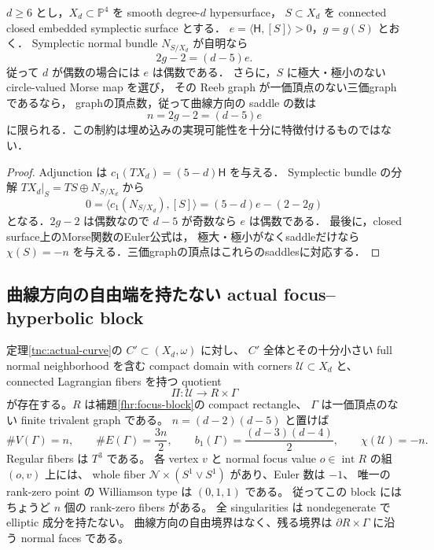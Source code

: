 \begin{corollary}
\label{tnc:degree-genus-parity}
$d\ge6$ とし，$X_d\subset\mathbb P^4$ を smooth degree-$d$ hypersurface，
$S\subset X_d$ を connected closed embedded symplectic surface とする．
$e=\langle\mathsf H,[S]\rangle>0$，$g=g(S)$ とおく．
Symplectic normal bundle $N_{S/X_d}$ が自明なら
\[
 2g-2=(d-5)e.
\]
従って $d$ が偶数の場合には $e$ は偶数である．
さらに，$S$ に極大・極小のない circle-valued Morse map を選び，
その Reeb graph が一価頂点のない三価graphであるなら，
graphの頂点数，従って曲線方向の saddle の数は
\[
 n=2g-2=(d-5)e
\]
に限られる．この制約は埋め込みの実現可能性を十分に特徴付けるものではない．
\end{corollary}

\begin{proof}
Adjunction は
$c_1(TX_d)=(5-d)\mathsf H$ を与える．
Symplectic bundle の分解 $TX_d|_S=TS\oplus N_{S/X_d}$ から
\[
 0=\langle c_1(N_{S/X_d}),[S]\rangle
  =(5-d)e-(2-2g)
\]
となる．$2g-2$ は偶数なので $d-5$ が奇数なら $e$ は偶数である．
最後に，closed surface上のMorse関数のEuler公式は，
極大・極小がなくsaddleだけなら
$\chi(S)=-n$ を与える．三価graphの頂点はこれらのsaddlesに対応する．
\end{proof}

\subsection{曲線方向の自由端を持たない actual focus--hyperbolic block}

\begin{corollary}\label{tnc:closed-block}
定理\ref{tnc:actual-curve}の $C'\subset(X_d,\omega)$ に対し、
$C'$ 全体とその十分小さい full normal neighborhood を含む compact domain with corners
$\mathcal U\subset X_d$ と、connected Lagrangian fibers を持つ quotient
\[
 \Pi:\mathcal U\longrightarrow R\times\Gamma
\]
が存在する。$R$ は補題\ref{fhr:focus-block}の compact rectangle、
$\Gamma$ は一価頂点のない finite trivalent graph である。
$n=(d-2)(d-5)$ と置けば
\begin{equation}\label{tnc:block-counts}
 \#V(\Gamma)=n,\qquad \#E(\Gamma)=\frac{3n}{2},\qquad
 b_1(\Gamma)=\frac{(d-3)(d-4)}2,
 \qquad \chi(\mathcal U)=-n.
\end{equation}
Regular fibers は $T^3$ である。
各 vertex $v$ と normal focus value $o\in\operatorname{int}R$ の組 $(o,v)$ 上には、
whole fiber $\mathcal N\times(S^1\vee S^1)$ があり、Euler 数は $-1$、
唯一の rank-zero point の Williamson type は $(0,1,1)$ である。
従ってこの block にはちょうど $n$ 個の rank-zero fibers がある。
全 singularities は nondegenerate で elliptic 成分を持たない。
曲線方向の自由境界はなく、残る境界は $\partial R\times\Gamma$ に沿う normal faces である。
\end{corollary}

